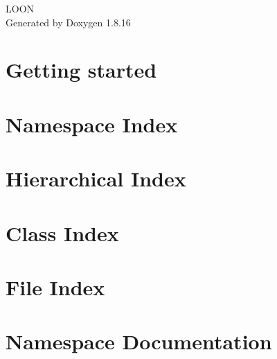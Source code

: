 \let\mypdfximage\pdfximage\def\pdfximage{\immediate\mypdfximage}\documentclass[twoside]{book}
\newcommand{\+}{\discretionary{\mbox{\scriptsize$\hookleftarrow$}}{}{}}
\newcommand{\clearemptydoublepage}{%
  \newpage{\pagestyle{empty}\cleardoublepage}%
}
\begin{document}
\hypersetup{pageanchor=false,
             bookmarksnumbered=true,
             pdfencoding=unicode
            }
\begin{titlepage}
\vspace*{7cm}
\begin{center}%
{\Large L\+O\+ON }\\
\vspace*{1cm}
{\large Generated by Doxygen 1.8.16}\\
\end{center}
\end{titlepage}
\clearemptydoublepage
{}
\tableofcontents
\clearemptydoublepage
{}
\hypersetup{pageanchor=true}

\chapter{Getting started}
\label{md__r_e_a_d_m_e}

\chapter{Namespace Index}

\chapter{Hierarchical Index}

\chapter{Class Index}

\chapter{File Index}

\chapter{Namespace Documentation}























\end{document}

